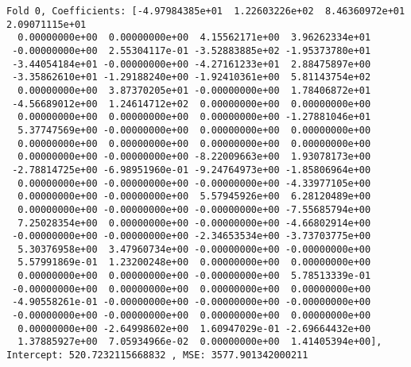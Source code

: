 \documentclass[11pt]{article}
\begin{document}
    \begin{Verbatim}[commandchars=\\\{\}]
Fold 0, Coefficients: [-4.97984385e+01  1.22603226e+02  8.46360972e+01  2.09071115e+01
  0.00000000e+00  0.00000000e+00  4.15562171e+00  3.96262334e+01
 -0.00000000e+00  2.55304117e-01 -3.52883885e+02 -1.95373780e+01
 -3.44054184e+01 -0.00000000e+00 -4.27161233e+01  2.88475897e+00
 -3.35862610e+01 -1.29188240e+00 -1.92410361e+00  5.81143754e+02
  0.00000000e+00  3.87370205e+01 -0.00000000e+00  1.78406872e+01
 -4.56689012e+00  1.24614712e+02  0.00000000e+00  0.00000000e+00
  0.00000000e+00  0.00000000e+00  0.00000000e+00 -1.27881046e+01
  5.37747569e+00 -0.00000000e+00  0.00000000e+00  0.00000000e+00
  0.00000000e+00  0.00000000e+00  0.00000000e+00  0.00000000e+00
  0.00000000e+00 -0.00000000e+00 -8.22009663e+00  1.93078173e+00
 -2.78814725e+00 -6.98951960e-01 -9.24764973e+00 -1.85806964e+00
  0.00000000e+00 -0.00000000e+00 -0.00000000e+00 -4.33977105e+00
  0.00000000e+00 -0.00000000e+00  5.57945926e+00  6.28120489e+00
  0.00000000e+00 -0.00000000e+00 -0.00000000e+00 -7.55685794e+00
  7.25028354e+00  0.00000000e+00 -0.00000000e+00 -4.66802914e+00
 -0.00000000e+00 -0.00000000e+00 -2.34653534e+00 -3.73703775e+00
  5.30376958e+00  3.47960734e+00 -0.00000000e+00 -0.00000000e+00
  5.57991869e-01  1.23200248e+00  0.00000000e+00  0.00000000e+00
  0.00000000e+00  0.00000000e+00 -0.00000000e+00  5.78513339e-01
 -0.00000000e+00  0.00000000e+00  0.00000000e+00  0.00000000e+00
 -4.90558261e-01 -0.00000000e+00 -0.00000000e+00 -0.00000000e+00
 -0.00000000e+00 -0.00000000e+00  0.00000000e+00  0.00000000e+00
  0.00000000e+00 -2.64998602e+00  1.60947029e-01 -2.69664432e+00
  1.37885927e+00  7.05934966e-02  0.00000000e+00  1.41405394e+00], Intercept: 520.7232115668832 , MSE: 3577.901342000211 


\end{Verbatim}
\end{document}
